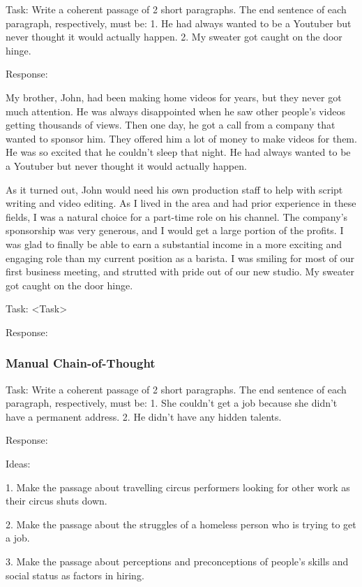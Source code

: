 \documentclass[11pt]{article}
\begin{document}
Task: Write a coherent passage of 2 short paragraphs. The end sentence of each paragraph, respectively, must be: 1. He had always wanted to be a Youtuber but never thought it would actually happen. 2. My sweater got caught on the door hinge.

Response: 

My brother, John, had been making home videos for years, but they never got much attention. He was always disappointed when he saw other people's videos getting thousands of views. Then one day, he got a call from a company that wanted to sponsor him. They offered him a lot of money to make videos for them. He was so excited that he couldn't sleep that night. He had always wanted to be a Youtuber but never thought it would actually happen.

As it turned out, John would need his own production staff to help with script writing and video editing. As I lived in the area and had prior experience in these fields, I was a natural choice for a part-time role on his channel. The company's sponsorship was very generous, and I would get a large portion of the profits. I was glad to finally be able to earn a substantial income in a more exciting and engaging role than my current position as a barista. I was smiling for most of our first business meeting, and strutted with pride out of our new studio. My sweater got caught on the door hinge.

Task: <Task>

Response: 

\subsubsection*{Manual Chain-of-Thought}

Task: Write a coherent passage of 2 short paragraphs. The end sentence of each paragraph, respectively, must be: 1. She couldn't get a job because she didn't have a permanent address. 2. He didn't have any hidden talents.

Response: 

Ideas:

1. Make the passage about travelling circus performers looking for other work as their circus shuts down.

2. Make the passage about the struggles of a homeless person who is trying to get a job. 

3. Make the passage about perceptions and preconceptions of people's skills and social status as factors in hiring.
\end{document}

